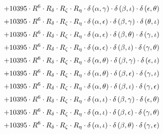 \begin{subequations}
\begin{gather}
 \\[0.2em] \notag 		 + 10395 \cdot R^{6} \cdot R_{\delta{}} \cdot R_{\zeta{}} \cdot R_{\eta{}} \cdot \delta{}\left(\alpha{}, \gamma{}\right) \cdot \delta{}\left(\beta{}, \iota{}\right) \cdot \delta{}\left(\epsilon{}, \theta{}\right) 
 \\[0.2em] \notag 		 + 10395 \cdot R^{6} \cdot R_{\delta{}} \cdot R_{\zeta{}} \cdot R_{\eta{}} \cdot \delta{}\left(\alpha{}, \epsilon{}\right) \cdot \delta{}\left(\beta{}, \gamma{}\right) \cdot \delta{}\left(\theta{}, \iota{}\right) 
 \\[0.2em] \notag 		 + 10395 \cdot R^{6} \cdot R_{\delta{}} \cdot R_{\zeta{}} \cdot R_{\eta{}} \cdot \delta{}\left(\alpha{}, \epsilon{}\right) \cdot \delta{}\left(\beta{}, \theta{}\right) \cdot \delta{}\left(\gamma{}, \iota{}\right) 
 \\[0.2em] \notag 		 + 10395 \cdot R^{6} \cdot R_{\delta{}} \cdot R_{\zeta{}} \cdot R_{\eta{}} \cdot \delta{}\left(\alpha{}, \epsilon{}\right) \cdot \delta{}\left(\beta{}, \iota{}\right) \cdot \delta{}\left(\gamma{}, \theta{}\right) 
 \\[0.2em] \notag 		 + 10395 \cdot R^{6} \cdot R_{\delta{}} \cdot R_{\zeta{}} \cdot R_{\eta{}} \cdot \delta{}\left(\alpha{}, \theta{}\right) \cdot \delta{}\left(\beta{}, \gamma{}\right) \cdot \delta{}\left(\epsilon{}, \iota{}\right) 
 \\[0.2em] \notag 		 + 10395 \cdot R^{6} \cdot R_{\delta{}} \cdot R_{\zeta{}} \cdot R_{\eta{}} \cdot \delta{}\left(\alpha{}, \theta{}\right) \cdot \delta{}\left(\beta{}, \epsilon{}\right) \cdot \delta{}\left(\gamma{}, \iota{}\right) 
 \\[0.2em] \notag 		 + 10395 \cdot R^{6} \cdot R_{\delta{}} \cdot R_{\zeta{}} \cdot R_{\eta{}} \cdot \delta{}\left(\alpha{}, \theta{}\right) \cdot \delta{}\left(\beta{}, \iota{}\right) \cdot \delta{}\left(\gamma{}, \epsilon{}\right) 
 \\[0.2em] \notag 		 + 10395 \cdot R^{6} \cdot R_{\delta{}} \cdot R_{\zeta{}} \cdot R_{\eta{}} \cdot \delta{}\left(\alpha{}, \iota{}\right) \cdot \delta{}\left(\beta{}, \gamma{}\right) \cdot \delta{}\left(\epsilon{}, \theta{}\right) 
 \\[0.2em] \notag 		 + 10395 \cdot R^{6} \cdot R_{\delta{}} \cdot R_{\zeta{}} \cdot R_{\eta{}} \cdot \delta{}\left(\alpha{}, \iota{}\right) \cdot \delta{}\left(\beta{}, \epsilon{}\right) \cdot \delta{}\left(\gamma{}, \theta{}\right) 
 \\[0.2em] \notag 		 + 10395 \cdot R^{6} \cdot R_{\delta{}} \cdot R_{\zeta{}} \cdot R_{\eta{}} \cdot \delta{}\left(\alpha{}, \iota{}\right) \cdot \delta{}\left(\beta{}, \theta{}\right) \cdot \delta{}\left(\gamma{}, \epsilon{}\right) 

\end{gather}
\end{subequations}
